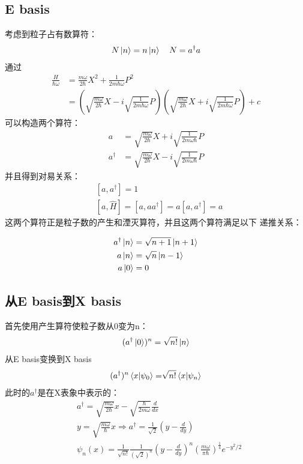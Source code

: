 \documentclass[UTF8]{article}
\numberwithin{equation}{section}
\begin{document}
\subsection{E basis}
考虑到粒子占有数算符：
\begin{align*}
    N \ket{n} = n \ket{n} \quad N = a^\dagger a
\end{align*}
通过
\begin{align*}
    \frac{H}{\hbar\omega}&=\frac{m\omega}{2\hbar}X^2+\frac{1}{2m\hbar\omega}P^2\\
                         &=\left(\sqrt{\frac{m\omega}{2\hbar}}X-i\sqrt{\frac{1}{2m\hbar\omega}}P\right)
                         \left(\sqrt{\frac{m\omega}{2\hbar}}X+i\sqrt{\frac{1}{2m\hbar\omega}}P\right)+c
\end{align*}
可以构造两个算符：
\begin{align*}
    a         & = \sqrt{\frac{m\omega}{2\hbar}}X+i\sqrt{\frac{1}{2m\omega\hbar}}P \\
    a^\dagger & = \sqrt{\frac{m\omega}{2\hbar}}X-i\sqrt{\frac{1}{2m\omega\hbar}}P 
\end{align*}
并且得到对易关系：
\begin{align*}
    &[a,a^\dagger]=1                                                    \\
    &[a,\hat{H} ]=[a,aa^\dagger]=a[a,a^\dagger]=a
\end{align*}
这两个算符正是粒子数的产生和湮灭算符，并且这两个算符满足以下
递推关系：
\begin{tcolorbox}[
    colframe=red,
]
\begin{equation*}
    \begin{aligned}
    a^\dagger\ket{n} &= \sqrt{n+1}\ket{n+1}\\
    a\ket{n} &= \sqrt{n}\ket{n-1}\quad \\
    a\ket{0} &= 0
    \end{aligned}
\end{equation*}
\end{tcolorbox}
\subsection{从E basis到X basis}
首先使用产生算符使粒子数从0变为n：
\begin{align*}
    (a^\dagger\ket{0})^n = \sqrt{n!} \ket{n} 
\end{align*}
从E basis变换到X basis
\begin{align*}
     & (a^\dagger)^n\braket{x}{\psi_0}=\sqrt[]{n!}\braket{x}{\psi_n} \\
\end{align*}
此时的$a^\dagger$是在X表象中表示的：
\begin{align*}
     & a^\dagger = \sqrt{\frac{m\omega}{2\hbar}}x-\sqrt{\frac{\hbar}{2m\omega}}\frac{d}{dx}                         \\
     & y = \sqrt{\frac{m\omega}{\hbar}}x\Rightarrow a^\dagger = \frac{1}{\sqrt{2}}
    (y-\frac{d}{dy})                                                        \\
     & \psi_n(x)=\frac{1}{\sqrt{n!}}\frac{1}{(\sqrt{2})^n}(y-\frac{d}{dy})^n(\frac{m\omega}{\pi \hbar})^\frac{1}{4}
    e^{-y^2/2}
\end{align*}
\end{document}
